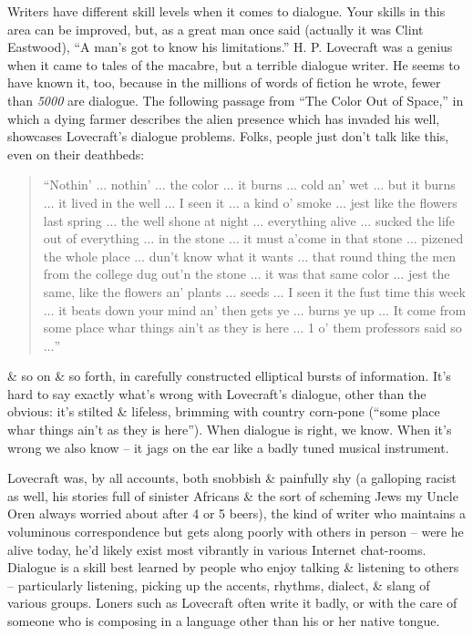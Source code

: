 \documentclass{article}
\numberwithin{equation}{section}
\begin{document}
Writers have different skill levels when it comes to dialogue. Your skills in this area can be improved, but, as a great man once said (actually it was Clint Eastwood), ``A man's got to know his limitations.'' H. P. Lovecraft was a genius when it came to tales of the macabre, but a terrible dialogue writer. He seems to have known it, too, because in the millions of words of fiction he wrote, fewer than \textit{5000} are dialogue. The following passage from ``The Color Out of Space,'' in which a dying farmer describes the alien presence which has invaded his well, showcases Lovecraft's dialogue problems. Folks, people just don't talk like this, even on their deathbeds:
\begin{quotation}
	``Nothin' $\ldots$ nothin' $\ldots$ the color $\ldots$ it burns $\ldots$ cold an' wet $\ldots$ but it burns $\ldots$ it lived in the well $\ldots$ I seen it $\ldots$ a kind o' smoke $\ldots$ jest like the flowers last spring $\ldots$ the well shone at night $\ldots$ everything alive $\ldots$ sucked the life out of everything $\ldots$ in the stone $\ldots$ it must a'come in that stone $\ldots$ pizened the whole place $\ldots$ dun't know what it wants $\ldots$ that round thing the men from the college dug out'n the stone $\ldots$ it was that same color $\ldots$ jest the same, like the flowers an' plants $\ldots$ seeds $\ldots$ I seen it the fust time this week $\ldots$ it beats down your mind an' then gets ye $\ldots$ burns ye up $\ldots$ It come from some place whar things ain't as they is here $\ldots$ 1 o' them professors said so $\ldots$''
\end{quotation}
\& so on \& so forth, in carefully constructed elliptical bursts of information. It's hard to say exactly what's wrong with Lovecraft's dialogue, other than the obvious: it's stilted \& lifeless, brimming with country corn-pone (``some place whar things ain't as they is here''). When dialogue is right, we know. When it's wrong we also know -- it jags on the ear like a badly tuned musical instrument.

Lovecraft was, by all accounts, both snobbish \& painfully shy (a galloping racist as well, his stories full of sinister Africans \& the sort of scheming Jews my Uncle Oren always worried about after 4 or 5 beers), the kind of writer who maintains a voluminous correspondence but gets along poorly with others in person -- were he alive today, he'd likely exist most vibrantly in various Internet chat-rooms. Dialogue is a skill best learned by people who enjoy talking \& listening to others -- particularly listening, picking up the accents, rhythms, dialect, \& slang of various groups. Loners such as Lovecraft often write it badly, or with the care of someone who is composing in a language other than his or her native tongue.
\end{document}
